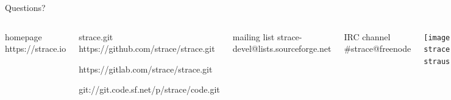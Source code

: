 \documentclass[unicode]{beamer}
\begin{document}
{
\begin{frame}{Questions?}
	\begin{columns}
		\column{7cm}
\begin{block}{\large homepage}
	https://strace.io
\end{block}
\begin{block}{\large strace.git}
	https://github.com/strace/strace.git

	https://gitlab.com/strace/strace.git

	git://git.code.sf.net/p/strace/code.git
\end{block}
\begin{block}{\large mailing list}
	strace-devel@lists.sourceforge.net
\end{block}
\begin{block}{\large IRC channel}
	\#strace@freenode
\end{block}
		\column{3cm}
			\centerline{\texttt{[image: strace-straus.pdf]}}
	\end{columns}
\end{frame}
}
\end{document}
